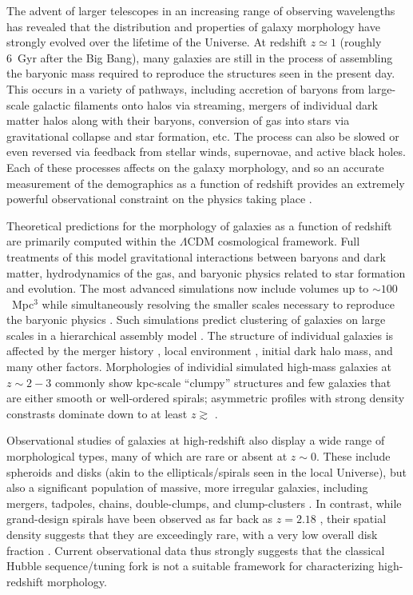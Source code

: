 \documentclass[twocolumn]{aastex6}
\begin{document}
The advent of larger telescopes in an increasing range of observing wavelengths has revealed that the distribution and properties of galaxy morphology have strongly evolved over the lifetime of the Universe. At redshift $z\simeq1$ (roughly 6~Gyr after the Big Bang), many galaxies are still in the process of assembling the baryonic mass required to reproduce the structures seen in the present day. This occurs in a variety of pathways, including accretion of baryons from large-scale galactic filaments onto halos via streaming, mergers of individual dark matter halos along with their baryons, conversion of gas into stars via gravitational collapse and star formation, etc. The process can also be slowed or even reversed via feedback from stellar winds, supernovae, and active black holes. Each of these processes affects on the galaxy morphology, and so an accurate measurement of the demographics as a function of redshift provides an extremely powerful observational constraint on the physics taking place \citep[for a recent review see][]{con14}. 

Theoretical predictions for the morphology of galaxies as a function of redshift are primarily computed within the $\Lambda$CDM cosmological framework. Full treatments of this model gravitational interactions between baryons and dark matter, hydrodynamics of the gas, and baryonic physics related to star formation and evolution. The most advanced simulations now include volumes up to $\sim100$~Mpc$^3$ while simultaneously resolving the smaller scales necessary to reproduce the baryonic physics \citep{vog14a,sch15}. Such simulations predict clustering of galaxies on large scales in a hierarchical assembly model \citep{sil12}. The structure of individual galaxies is affected by the merger history \citep{too72,hop10}, local environment \citep[such as the morphology-density relation;][]{dre80}, initial dark halo mass, and many other factors. Morphologies of individial simulated high-mass galaxies at $z\sim2-3$ commonly show kpc-scale ``clumpy'' structures and few galaxies that are either smooth or well-ordered spirals; asymmetric profiles with strong density constrasts dominate down to at least $z\gtrsim$ \citep{gen14}. 

Observational studies of galaxies at high-redshift also display a wide range of morphological types, many of which are rare or absent at $z\sim0$. These include spheroids and disks (akin to the ellipticals/spirals seen in the local Universe), but also a significant population of massive, more irregular galaxies, including mergers, tadpoles, chains, double-clumps, and clump-clusters \citep{elm05,elm07,cam11a,for11a,kar15}. In contrast, while grand-design spirals have been observed as far back as $z=2.18$ \citep{law12}, their spatial density suggests that they are exceedingly rare, with a very low overall disk fraction \citep{mor13}. Current observational data thus strongly suggests that the classical Hubble sequence/tuning fork \citep{hub36} is not a suitable framework for characterizing high-redshift morphology. 
\end{document}
